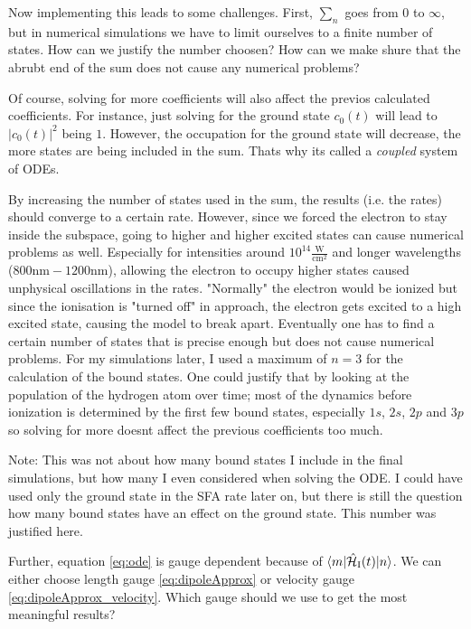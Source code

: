 \medskip
Now implementing this leads to some challenges.
First, $\sum_n$ goes from $0$ to $\infty$, but in numerical simulations we have to limit ourselves to a finite number of states.
How can we justify the number choosen?
How can we make shure that the abrubt end of the sum does not cause any numerical problems?

Of course, solving for more coefficients will also affect the previos calculated coefficients.
For instance, just solving for the ground state $c_0(t)$ will lead to $|c_0(t)|^2$ being $1$.
However, the occupation for the ground state will decrease, the more states are being included in the sum.
Thats why its called a \emph{coupled} system of ODEs.

By increasing the number of states used in the sum, the results (i.e. the rates) should converge to a certain rate.
However, since we forced the electron to stay inside the subspace, going to higher and higher excited states can cause numerical problems as well.
Especially for intensities around $10^{14}\frac{\mathrm{W}}{\mathrm{cm}^2}$ and longer wavelengths ($800\mathrm{nm}-1200\mathrm{nm}$), allowing the electron to occupy higher states caused unphysical oscillations in the rates. 
"Normally" the electron would be ionized but since the ionisation is "turned off" in approach, the electron gets excited to a high excited state, causing the model to break apart.
Eventually one has to find a certain number of states that is precise enough but does not cause numerical problems.
For my simulations later, I used a maximum of $n=3$ for the calculation of the bound states.
One could justify that by looking at the population of the hydrogen atom over time; most of the dynamics before ionization is determined by the first few bound states, especially $1s$, $2s$, $2p$ and $3p$ so solving for more doesnt affect the previous coefficients too much.

Note: This was not about how many bound states I include in the final simulations, but how many I even considered when solving the ODE.
I could have used only the ground state in the SFA rate later on, but there is still the question how many bound states have an effect on the ground state. 
This number was justified here.


\medskip
Further, equation \eqref{eq:ode} is gauge dependent because of $\braket{m|\hat{\mathcal{H}}_{\mathrm{I}}(t)|n}$. 
We can either choose length gauge \eqref{eq:dipoleApprox} or velocity gauge \eqref{eq:dipoleApprox_velocity}.
Which gauge should we use to get the most meaningful results?

